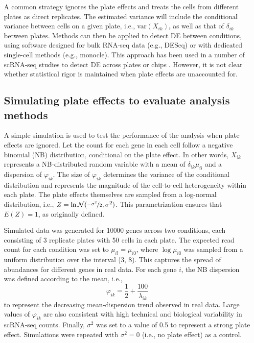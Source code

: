 \documentclass{article}
\begin{document}
A common strategy ignores the plate effects and treats the cells from different plates as direct replicates.
The estimated variance will include the conditional variance between cells on a given plate, i.e., var$(X_{ik})$, as well as that of $\delta_{ik}$ between plates.
Methods can then be applied to detect DE between conditions, using software designed for bulk RNA-seq data (e.g., DESeq) or with dedicated single-cell methods (e.g., monocle).
This approach has been used in a number of scRNA-seq studies to detect DE across plates or chips \cite{kolod2015single,trapnell2014dynamics,avraham2015pathogen}.
However, it is not clear whether statistical rigor is maintained when plate effects are unaccounted for.


\subsection{Simulating plate effects to evaluate analysis methods}
A simple simulation is used to test the performance of the analysis when plate effects are ignored.
Let the count for each gene in each cell follow a negative binomial (NB) distribution, conditional on the plate effect.
In other words, $X_{ik}$ represents a NB-distributed random variable with a mean of $\delta_{ik}\mu_{il}$ and a dispersion of $\varphi_{ik}$.
The size of $\varphi_{ik}$ determines the variance of the conditional distribution and represents the magnitude of the cell-to-cell heterogeneity within each plate.
The plate effects themselves are sampled from a log-normal distribution, i.e., $Z = \ln \mathcal{N}(\nicefrac{-\sigma^2}{2}, \sigma^2)$.
This parametrization ensures that $E(Z)=1$, as originally defined.

Simulated data was generated for 10000 genes across two conditions, each consisting of 3 replicate plates with 50 cells in each plate.
The expected read count for each condition was set to $\mu_{il}=\mu_{i0}$, where $\log \mu_{i0}$ was sampled from a uniform distribution over the interval (3, 8).
This captures the spread of abundances for different genes in real data. 
For each gene $i$, the NB dispersion was defined according to the mean, i.e., 
\[
    \varphi_{ik} = \frac{1}{2} + \frac{100}{\lambda_{ik}} 
\]
to represent the decreasing mean-dispersion trend observed in real data.
Large values of $\varphi_{ik}$ are also consistent with high technical and biological variability in scRNA-seq counts.
Finally, $\sigma^2$ was set to a value of 0.5 to represent a strong plate effect.
Simulations were repeated with $\sigma^2=0$ (i.e., no plate effect) as a control. 
\end{document}
